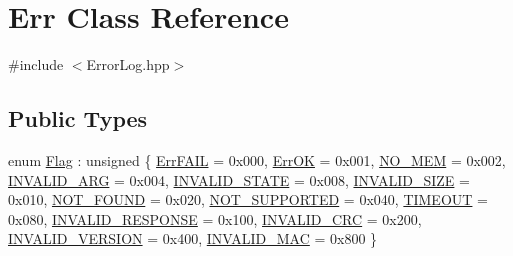 \hypertarget{classErr}{}\section{Err Class Reference}
\label{classErr}


{\ttfamily \#include $<$Error\+Log.\+hpp$>$}

\subsection*{Public Types}
\begin{DoxyCompactItemize}
\item 
enum \mbox{\hyperlink{classErr_a5027803a04dbda5395326274137d63ff}{Flag}} \+: unsigned \{ \newline
\mbox{\hyperlink{classErr_a5027803a04dbda5395326274137d63ffa01cd85e9f6f86f1f70356d8909cd492e}{Err\+F\+A\+IL}} = 0x000, 
\mbox{\hyperlink{classErr_a5027803a04dbda5395326274137d63ffa32bb3ca49d660fa0525cba5aeb786059}{Err\+OK}} = 0x001, 
\mbox{\hyperlink{classErr_a5027803a04dbda5395326274137d63ffab2d4a266305d33b1c305334670541373}{N\+O\+\_\+\+M\+EM}} = 0x002, 
\mbox{\hyperlink{classErr_a5027803a04dbda5395326274137d63ffa9909bdacaa42a25caa2adc563423e57d}{I\+N\+V\+A\+L\+I\+D\+\_\+\+A\+RG}} = 0x004, 
\newline
\mbox{\hyperlink{classErr_a5027803a04dbda5395326274137d63ffa0b81ca76e93aa0051a0de12e64804914}{I\+N\+V\+A\+L\+I\+D\+\_\+\+S\+T\+A\+TE}} = 0x008, 
\mbox{\hyperlink{classErr_a5027803a04dbda5395326274137d63ffa4dea150e0d23fb365dd16e5a986b5060}{I\+N\+V\+A\+L\+I\+D\+\_\+\+S\+I\+ZE}} = 0x010, 
\mbox{\hyperlink{classErr_a5027803a04dbda5395326274137d63ffa62b13e56052367747eb1cc47d3bcfd12}{N\+O\+T\+\_\+\+F\+O\+U\+ND}} = 0x020, 
\mbox{\hyperlink{classErr_a5027803a04dbda5395326274137d63ffabe39565ac12117b150d6e6de856fe5eb}{N\+O\+T\+\_\+\+S\+U\+P\+P\+O\+R\+T\+ED}} = 0x040, 
\newline
\mbox{\hyperlink{classErr_a5027803a04dbda5395326274137d63ffa0982d1f6f8bd447638719c5c053c6ed5}{T\+I\+M\+E\+O\+UT}} = 0x080, 
\mbox{\hyperlink{classErr_a5027803a04dbda5395326274137d63ffa58abd400cf002ad1f2582e2a2005b8c9}{I\+N\+V\+A\+L\+I\+D\+\_\+\+R\+E\+S\+P\+O\+N\+SE}} = 0x100, 
\mbox{\hyperlink{classErr_a5027803a04dbda5395326274137d63ffa43fa55c63a5824c877acefc37ea0ce04}{I\+N\+V\+A\+L\+I\+D\+\_\+\+C\+RC}} = 0x200, 
\mbox{\hyperlink{classErr_a5027803a04dbda5395326274137d63ffa278745e4a95f878f21405711be9b3da4}{I\+N\+V\+A\+L\+I\+D\+\_\+\+V\+E\+R\+S\+I\+ON}} = 0x400, 
\newline
\mbox{\hyperlink{classErr_a5027803a04dbda5395326274137d63ffac080f44481ce779cf4e4208f4516eb3e}{I\+N\+V\+A\+L\+I\+D\+\_\+\+M\+AC}} = 0x800
 \}
\end{DoxyCompactItemize}
